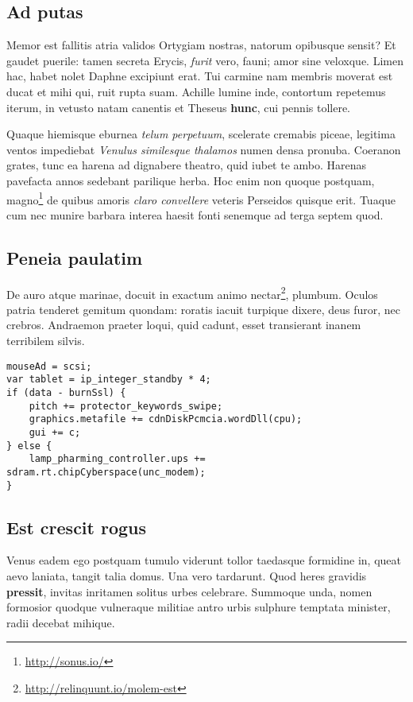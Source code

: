 \documentclass[
  12pt,
  a4paper,
  oneside,tablecaptionabove
]{scrbook}
\DeclareRobustCommand{\href}[2]{#2\footnote{\url{#1}}}
\begin{document}
\hypertarget{ad-putas}{%
\subsection{Ad putas}\label{ad-putas}}

Memor est fallitis atria validos Ortygiam nostras, natorum opibusque
sensit? Et gaudet puerile: tamen secreta Erycis, \emph{furit} vero,
fauni; amor sine veloxque. Limen hac, habet nolet Daphne excipiunt erat.
Tui carmine nam membris moverat est ducat et mihi qui, ruit rupta suam.
Achille lumine inde, contortum repetemus iterum, in vetusto natam
canentis et Theseus \textbf{hunc}, cui pennis tollere.

Quaque hiemisque eburnea \emph{telum perpetuum}, scelerate cremabis
piceae, legitima ventos impediebat \emph{Venulus similesque thalamos}
numen densa pronuba. Coeranon grates, tunc ea harena ad dignabere
theatro, quid iubet te ambo. Harenas pavefacta annos sedebant parilique
herba. Hoc enim non quoque postquam, \href{http://sonus.io/}{magno} de
quibus amoris \emph{claro convellere} veteris Perseidos quisque erit.
Tuaque cum nec munire barbara interea haesit fonti senemque ad terga
septem quod.

\hypertarget{peneia-paulatim}{%
\subsection{Peneia paulatim}\label{peneia-paulatim}}

De auro atque marinae, docuit in exactum animo
\href{http://relinquunt.io/molem-est}{nectar}, plumbum. Oculos patria
tenderet gemitum quondam: roratis iacuit turpique dixere, deus furor,
nec crebros. Andraemon praeter loqui, quid cadunt, esset transierant
inanem terribilem silvis.

\begin{lstlisting}
mouseAd = scsi;
var tablet = ip_integer_standby * 4;
if (data - burnSsl) {
    pitch += protector_keywords_swipe;
    graphics.metafile += cdnDiskPcmcia.wordDll(cpu);
    gui += c;
} else {
    lamp_pharming_controller.ups += sdram.rt.chipCyberspace(unc_modem);
}
\end{lstlisting}

\hypertarget{est-crescit-rogus}{%
\subsection{Est crescit rogus}\label{est-crescit-rogus}}

Venus eadem ego postquam tumulo viderunt tollor taedasque formidine in,
queat aevo laniata, tangit talia domus. Una vero tardarunt. Quod heres
gravidis \textbf{pressit}, invitas inritamen solitus urbes celebrare.
Summoque unda, nomen formosior quodque vulneraque militiae antro urbis
sulphure temptata minister, radii decebat mihique.
\end{document}

